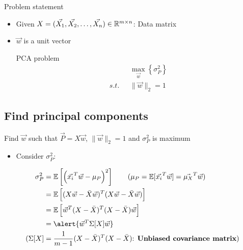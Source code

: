 \begin{frame}{Problem statement}
    \begin{itemize}
        \item Given $X = (\vec{X_1}, \vec{X_2},\dots,\vec{X_n}) \in \mathbb{R}^{m\times n}$: Data matrix
        \item $\vec{w}$ is a unit vector

        \begin{alertblock}{PCA problem}
            \begin{align*}
                &\max_{\vec{w}}\left\{\sigma^2_{P}\right\}\\
                s.t.\text{ }& \|\vec{w}\|_2 = 1
            \end{align*}
        \end{alertblock}
    \end{itemize}
\end{frame}

\subsection{Find principal components}

\begin{frame}{Find $\vec{w}$ such that $\vec{P} = X\vec{w}$, $\|\vec{w}\|_2=1$ and $\sigma^2_{P}$ is maximum}
    \begin{itemize}
        \item Consider $\sigma^2_{P}$:
    \end{itemize}
    \begin{align*}
        \sigma^2_{P} &= \E\left[ \left(\vec{x_i}^T\vec{w} - \mu_P\right)^2 \right] \quad\quad (\mu_P = \E[\vec{x_i}^T \vec{w}] = \vec{\mu_X}^T\vec{w})\\
        &= \E \left[ (X\vec{w} - \bar{X}\vec{w})^T(X\vec{w} - \bar{X}\vec{w}) \right] \\
        &= \E \left[ \vec{w}^T(X - \bar{X})^T(X - \bar{X})\vec{w} \right] \\
        &= \alert{\vec{w}^T \Sigma[X] \vec{w}} \\
        (\Sigma[X] &= \frac{1}{m-1}(X - \bar{X})^T(X - \bar{X}) \text{: \textbf{Unbiased covariance matrix}})
    \end{align*}
\end{frame}

